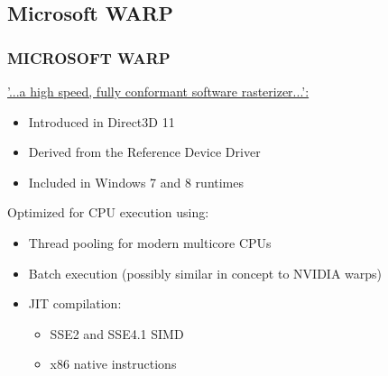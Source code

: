 \subsection{Microsoft WARP}
\begin{frame}
\frametitle{MICROSOFT WARP}

\href{http://msdn.microsoft.com/en-us/library/windows/desktop/gg615082(v=vs.85)%
  .aspx}{'...a high speed, fully conformant software rasterizer...':}
\begin{itemize}
\item Introduced in Direct3D 11
\item Derived from the Reference Device Driver
\item Included in Windows 7 and 8 runtimes
\end{itemize}

Optimized for CPU execution using:
\begin{itemize}
\item Thread pooling for modern multicore CPUs
\item Batch execution (possibly similar in concept to NVIDIA warps)
\item JIT compilation:
  \begin{itemize}
  \item SSE2 and SSE4.1 SIMD
  \item x86 native instructions
  \end{itemize}
\end{itemize}

\end{frame}

